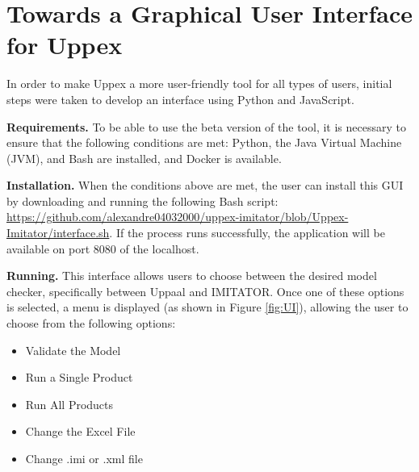 
\chapter{Towards a Graphical User Interface for Uppex}

In order to make Uppex a more user-friendly tool for all types of users, initial steps were taken to develop an interface using Python and JavaScript.

\medskip

\noindent
\textbf{Requirements.} To be able to use the beta version of the tool, it is necessary to ensure that the following conditions are met: Python, the Java Virtual Machine (JVM), and Bash are installed, and Docker is available.

\medskip

\noindent
\textbf{Installation.} When the conditions above are met, the user can install this GUI by downloading and running the following Bash script:
\url{https://github.com/alexandre04032000/uppex-imitator/blob/Uppex-Imitator/interface.sh}. If the process runs successfully, the application will be available on port 8080 of the localhost.

\medskip

\noindent
\textbf{Running.} This interface allows users to choose between the desired model checker, specifically between Uppaal and IMITATOR. Once one of these options is selected, a menu is displayed (as shown in Figure \ref{fig:UI}), allowing the user to choose from the following options:

\begin{itemize}
    \item Validate the Model
    \item Run a Single Product
    \item Run All Products
    \item Change the Excel File
    \item Change .imi or .xml file
\end{itemize}

